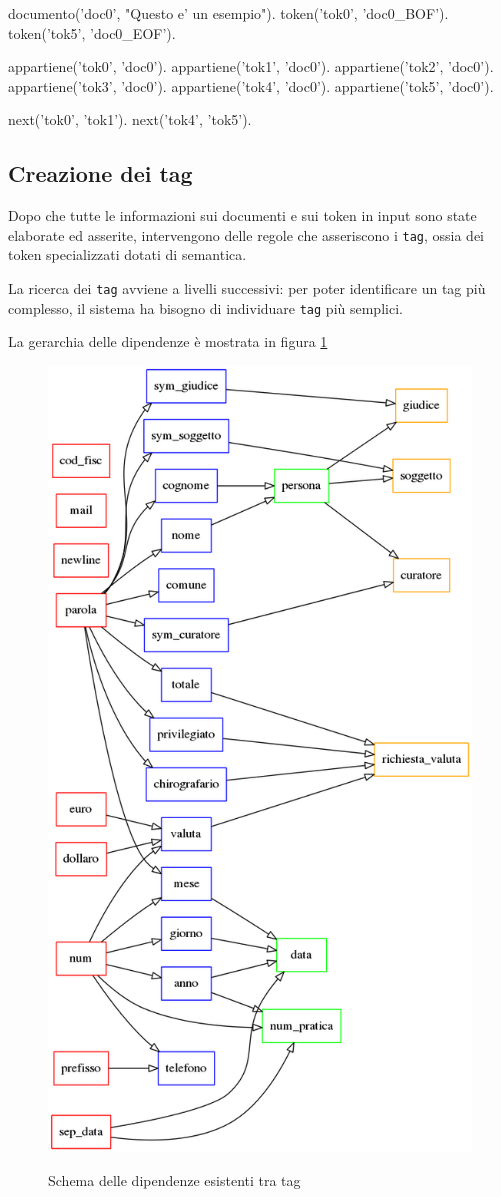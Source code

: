 \begin{prologcode}
documento('doc0', "Questo e' un esempio").
token('tok0', 'doc0_BOF').
token('tok5', 'doc0_EOF').

appartiene('tok0', 'doc0').
appartiene('tok1', 'doc0').
appartiene('tok2', 'doc0').
appartiene('tok3', 'doc0').
appartiene('tok4', 'doc0').
appartiene('tok5', 'doc0').

next('tok0', 'tok1').
next('tok4', 'tok5').
\end{prologcode}

\subsection{Creazione dei tag}
Dopo che tutte le informazioni sui documenti e sui token in input sono state elaborate ed asserite, intervengono delle regole che asseriscono i \verb|tag|, ossia dei token specializzati dotati di semantica.

La ricerca dei \verb|tag| avviene a livelli successivi:
per poter identificare un tag più complesso, il sistema ha bisogno di individuare \verb|tag| più semplici.

La gerarchia delle dipendenze è mostrata in figura \ref{fig:dipendenze}


\begin{figure}[H]
\centering
\includegraphics[width=.8\textwidth]{img/dipendenze.png}
\label{fig:dipendenze}
\caption[Dipendenze tra tag]{Schema delle dipendenze esistenti tra tag}
\end{figure}

